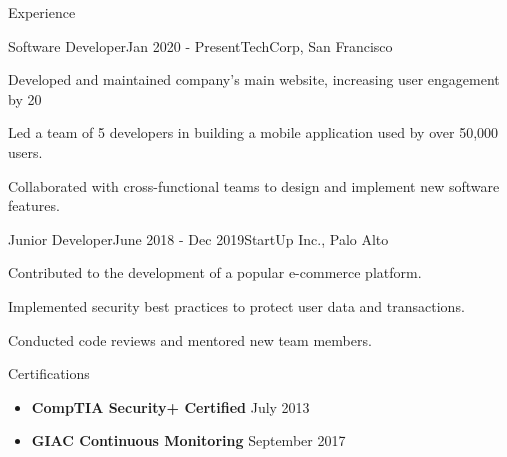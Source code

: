 \documentclass[]{mcdowellcv}
\begin{document}
\makeheader
      

\begin{cvsection}{Experience}

    \begin{jobentry}{Software Developer}{Jan 2020 - Present}{TechCorp, San Francisco}
        \begin{jobdescription}
            \item Developed and maintained company's main website, increasing user engagement by 20%
            \item Led a team of 5 developers in building a mobile application used by over 50,000 users.
            \item Collaborated with cross-functional teams to design and implement new software features.
        \end{jobdescription}
    \end{jobentry}
    
    \begin{jobentry}{Junior Developer}{June 2018 - Dec 2019}{StartUp Inc., Palo Alto}
        \begin{jobdescription}
            \item Contributed to the development of a popular e-commerce platform.
            \item Implemented security best practices to protect user data and transactions.
            \item Conducted code reviews and mentored new team members.
        \end{jobdescription}
    \end{jobentry}

\end{cvsection}


\begin{cvsection}{Certifications}
	\begin{cvsubsection}{}{}{}
		\begin{itemize}
			\setlength\itemsep{3pt}
			\item \textbf{CompTIA Security+ Certified}  July 2013
			\item \textbf{GIAC Continuous Monitoring}  September 2017
		\end{itemize}
	\end{cvsubsection}
\end{cvsection}
\ 
\end{document}
